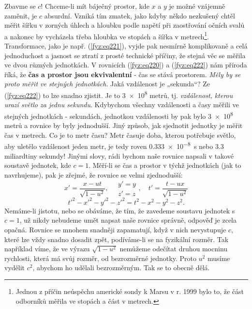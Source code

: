     Zbavme se \(c\)! Chceme-li mít báječný prostor, kde \(x\) a \(y\) je možné vzájemně zaměnit, je
    \(c\) absurdní. Vzniká tím zmatek, jako kdyby někdo nezkušený chtěl měřit šířku v zorných úhlech
    a hloubku podle napětí při zaostřování očních svalů a nakonec by vycházela třeba hloubka ve
    stopách a šířka v metrech\footnote{Jednou z příčin neúspěchu americké sondy k Marsu v r.
    \num{1999} bylo to, že část odborníků měřila ve stopách a část v metrech.}. Transformace, jako
    je např. (\ref{fyz:eq221}), vyjde pak nesmírně komplikovaně a celá jednoduchost a jasnost se
    ztratí z prosté technické příčiny, že stejná věc se měřila ve dvou různých jednotkách. V
    rovnicích (\ref{fyz:eq220}) a (\ref{fyz:eq222}) nám příroda říká, že \textbf{čas a prostor jsou
    ekvivalentní} - čas se stává prostorem. \emph{Měly by se proto měřit ve stejných jednotkách}.
    Jaká vzdálenost je „sekunda“? Ze (\ref{fyz:eq222}) to lze snadno zjistit. Je to \num{3e8} metrů,
    tj. \emph{vzdálenost, kterou urazí světlo za jednu sekundu}. Kdybychom všechny vzdálenosti a
    časy měřili ve stejných jednotkách - sekundách, jednotkou vzdálenosti by pak bylo \num{3e8}
    metrů a rovnice by byly jednodušší. Jiný způsob, jak sjednotit jednotky je měřit čas v metrech.
    Co je to metr času? Metr časuje doba, kterou potřebuje světlo, aby uletělo vzdálenost jeden
    metr, je tedy roven \qty{0.333e-8}{\s} nebo \num{3.3} miliardtiny sekundy! Jinými slovy, rádi
    bychom naše rovnice napsali v takové soustavě jednotek, kde \(c = 1\). Měří-li se čas a prostor
    v týchž jednotkách (jak to navrhujeme), pak je zřejmé, že rovnice se velmi zjednodušší:
    \begin{equation}\label{fyz:eq223}
      x' = \frac{x - ut}{\sqrt{1-u^2}},              \quad
      \begin{array}{c}
        y' = y \\ 
        z' = z
      \end{array}\!,                                 \quad
        t' = \frac{t-ux}{\sqrt{1-u^2}} 
    \end{equation}
    \begin{equation}\label{fyz:eq224}
      t'^2 - x'^2 - y'^2 - z'^2 = t^2 - x^2 - y^2 - z^2.
    \end{equation}
    Nemáme-li jistotu, nebo se obáváme, že tím, že zavedeme soustavu jednotek s \(c= 1\), už nikdy 
    nebudeme umět napsat naše rovnice správně, odpověď je zcela opačná. Rovnice se mnohem snadněji 
    zapamatují, když v nich nevystupuje \(c\), které lze vždy snadno dosadit zpět, podíváme-li se 
    na fyzikální rozměr. Tak například víme, že ve výrazu \(\sqrt{1 - u^2}\) nemůžeme odečítat 
    druhou mocninu rychlosti, která má svůj rozměr, od bezrozměrné jednotky. Proto \(u^2\) musíme 
    vydělit \(c^2\), abychom ho udělali bezrozměrným. Tak se to obecně dělá.
    
